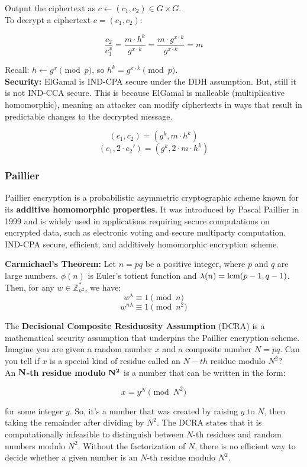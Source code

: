 Output the ciphertext as $c \leftarrow (c_1, c_2) \in G\times G$. \\

To decrypt a ciphertext $c = (c_1, c_2)$:

\[ \frac{c_2}{c_1^x} = \frac{m \cdot h^k}{g^{x\cdot k}} = \frac{m \cdot g^{x\cdot k}}{g^{x\cdot k}} = m\] 

Recall: $h \leftarrow g^x \pmod{p}$, so $h^k = g^{x\cdot k} \pmod{p}$. \\

\textbf{Security:}
ElGamal is IND-CPA secure under the DDH assumption. But, still it is not IND-CCA secure.
This is because ElGamal is malleable (multiplicative homomorphic), meaning an attacker can modify ciphertexts in ways that result in predictable changes to the decrypted message.

\[ (c_1, c_2) = (g^k, m \cdot h^k) \]
\[ (c_1, 2\cdot c_2') =(g^k, 2\cdot m \cdot h^k)  \]

\subsubsection{Paillier}
Paillier encryption is a probabilistic asymmetric cryptographic scheme known for its \textbf{additive homomorphic properties}. It was introduced by Pascal Paillier in 1999 and is widely used in applications requiring secure computations on encrypted data, such as electronic voting and secure multiparty computation.
IND-CPA secure, efficient, and additively homomorphic encryption scheme.

\begin{thm}
    \textbf{Carmichael's Theorem:} Let $n = pq$ be a positive integer, where $p$ and $q$ are large numbers. $\phi(n)$ is Euler's 
    totient function and $\lambda(n) = \text{lcm}(p-1, q-1)$. Then, for any $w \in \mathbb{Z}_{n^2}^*$, we have:
    \[ w^{\lambda} \equiv 1 \pmod{n} \]
    \[ w^{n\lambda} \equiv 1 \pmod{n^2} \]

\end{thm}

\begin{defn}
    The \textbf{Decisional Composite Residuosity Assumption} (DCRA) is a mathematical security assumption that underpins the Paillier encryption scheme. 
    Imagine you are given a random number $x$ and a composite number $N = pq$. 
    Can you tell if $x$ is a special kind of residue called an $N-th$ residue modulo $N^2$? \\


    An $\bold{N}$\textbf{-th residue modulo} $\bold{N^2}$ is a number that can be written in the form:

    \[ x = y^N \pmod{N^2} \]

    for some integer $y$. So, it's a number that was created by raising $y$ to $N$, then taking the remainder
    after dividing by $N^2$. 
    The DCRA states that it is computationally infeasible to distinguish between $N$-th residues and random numbers modulo $N^2$.
    Without the factorization of $N$, there is no efficient way to decide whether a given number is an $N$-th residue modulo $N^2$.
\end{defn}

